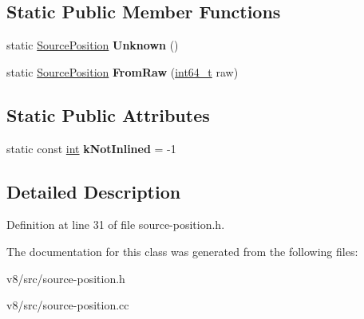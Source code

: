 \subsection*{Static Public Member Functions}
\begin{DoxyCompactItemize}
\item 
\mbox{\label{classv8_1_1internal_1_1SourcePosition_a55c6238897a170cf326f1387d12fddc3}} 
static \mbox{\hyperlink{classv8_1_1internal_1_1SourcePosition}{Source\+Position}} {\bfseries Unknown} ()
\item 
\mbox{\label{classv8_1_1internal_1_1SourcePosition_a0dda2b6075541741eb2101ac49965c9e}} 
static \mbox{\hyperlink{classv8_1_1internal_1_1SourcePosition}{Source\+Position}} {\bfseries From\+Raw} (\mbox{\hyperlink{classint64__t}{int64\+\_\+t}} raw)
\end{DoxyCompactItemize}
\subsection*{Static Public Attributes}
\begin{DoxyCompactItemize}
\item 
\mbox{\label{classv8_1_1internal_1_1SourcePosition_a82ff8870419b8c79f71ed1093390b277}} 
static const \mbox{\hyperlink{classint}{int}} {\bfseries k\+Not\+Inlined} = -\/1
\end{DoxyCompactItemize}


\subsection{Detailed Description}


Definition at line 31 of file source-\/position.\+h.



The documentation for this class was generated from the following files\+:\begin{DoxyCompactItemize}
\item 
v8/src/source-\/position.\+h\item 
v8/src/source-\/position.\+cc\end{DoxyCompactItemize}
